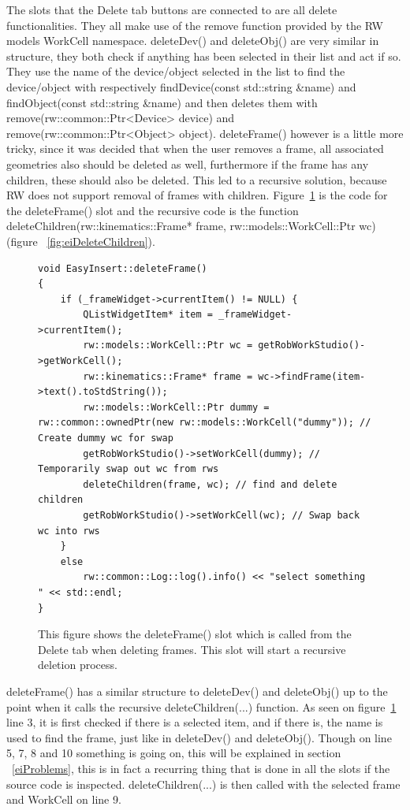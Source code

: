The slots that the Delete tab buttons are connected to are all delete functionalities. They all make use of the remove function provided by the RW models WorkCell namespace. deleteDev() and deleteObj() are very similar in structure, they both check if anything has been selected in their list and act if so. They use the name of the device/object selected in the list to find the device/object with respectively findDevice(const std::string \&name) and findObject(const std::string \&name) and then deletes them with remove(rw::common::Ptr<Device> device) and remove(rw::common::Ptr<Object> object).
deleteFrame() however is a little more tricky, since it was decided that when the user removes a frame, all associated geometries also should be deleted as well, furthermore if the frame has any children, these should also be deleted. This led to a recursive solution, because RW does not support removal of frames with children. Figure~\ref{fig:eiDeleteFrames} is the code for the deleteFrame() slot and the recursive code is the function deleteChildren(rw::kinematics::Frame* frame, rw::models::WorkCell::Ptr wc) (figure ~\ref{fig:eiDeleteChildren}). 

\begin{figure}[h] %
\centering
\lstset{language=C++} 
\begin{lstlisting}[frame=single]  
void EasyInsert::deleteFrame()
{
    if (_frameWidget->currentItem() != NULL) {
        QListWidgetItem* item = _frameWidget->currentItem();
        rw::models::WorkCell::Ptr wc = getRobWorkStudio()->getWorkCell();
        rw::kinematics::Frame* frame = wc->findFrame(item->text().toStdString());
        rw::models::WorkCell::Ptr dummy = rw::common::ownedPtr(new rw::models::WorkCell("dummy")); // Create dummy wc for swap
        getRobWorkStudio()->setWorkCell(dummy); // Temporarily swap out wc from rws
        deleteChildren(frame, wc); // find and delete children
        getRobWorkStudio()->setWorkCell(wc); // Swap back wc into rws
    }
    else
        rw::common::Log::log().info() << "select something " << std::endl;
}
\end{lstlisting}
\caption{This figure shows the deleteFrame() slot which is called from the Delete tab when deleting frames. This slot will start a recursive deletion process.}
\label{fig:eiDeleteFrames} 	
\end{figure}

deleteFrame() has a similar structure to deleteDev() and deleteObj() up to the point when it calls the recursive deleteChildren(...) function. As seen on figure~\ref{fig:eiDeleteFrames} line 3, it is first checked if there is a selected item, and if there is, the name is used to find the frame, just like in deleteDev() and deleteObj(). Though on line 5, 7, 8 and 10 something is going on, this will be explained in section ~\ref{eiProblems}, this is in fact a recurring thing that is done in all the slots if the source code is inspected. 
deleteChildren(...) is then called with the selected frame and WorkCell on line 9.

